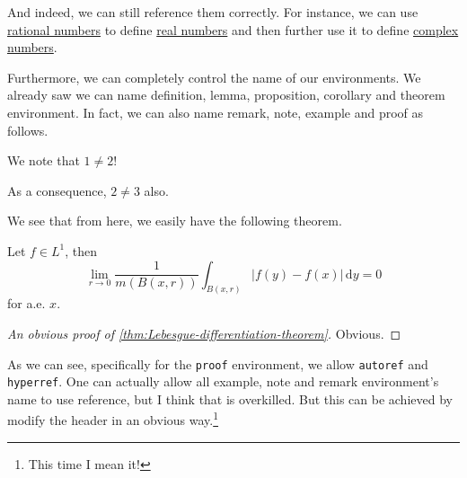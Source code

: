 \begin{note}
	And indeed, we can still reference them correctly. For instance, we can use \hyperref[def:rational]{rational numbers} to define \hyperref[def:real]{real numbers} and then further use it to define \hyperref[def:complex]{complex numbers}.
\end{note}

Furthermore, we can completely control the name of our environments. We already saw we can name definition, lemma, proposition, corollary and theorem environment. In fact, we can also name remark, note, example and proof as follows.
\begin{eg}\label{eg}
	We note that \(1 \neq 2\)!
	\begin{note}
		As a consequence, \(2 \neq 3\) also.
	\end{note}

	\begin{remark}
		We see that from here, we easily have the following theorem.
		\begin{theorem}\label{thm:Lebesgue-differentiation-theorem}
			Let \(f\in L^1\), then
			\[
				\lim\limits_{r \to 0} \frac{1}{m(B(x, r))}\int_{B(x, r)}\left\vert f(y) - f(x) \right\vert   \,\mathrm{d}y = 0
			\]
			for a.e. \(x\).
		\end{theorem}
		\begin{proof}[An obvious proof of \autoref{thm:Lebesgue-differentiation-theorem}]
			Obvious.
		\end{proof}
	\end{remark}
\end{eg}
As we can see, specifically for the \texttt{proof} environment, we allow \texttt{autoref} and \texttt{hyperref}. One can actually allow all example, note and remark environment's name to use reference, but I think that is overkilled. But this can be achieved by modify the header in an obvious way.\footnote{This time I mean it!}
